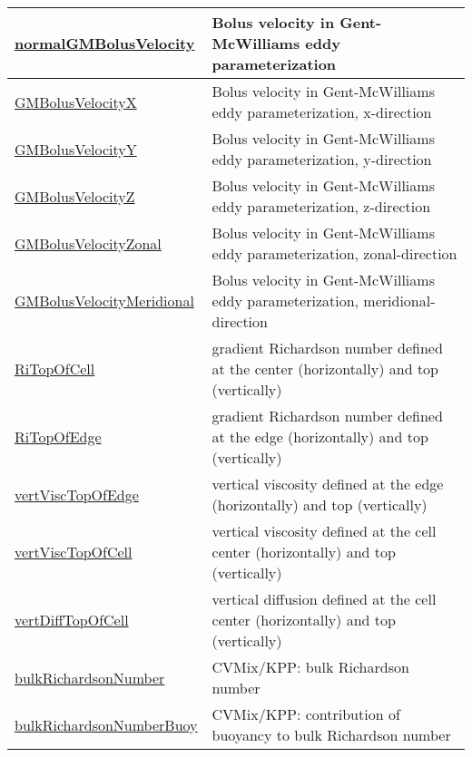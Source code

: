 {\begin{center}
\begin{longtable}{| p{2.0in} | p{4.0in} |}
    \hline
    \hyperref[subsec:var_sec_diagnostics_normalGMBolusVelocity]{normalGMBolusVelocity} & Bolus velocity in Gent-McWilliams eddy parameterization \\
    \hline
    \hyperref[subsec:var_sec_diagnostics_GMBolusVelocityX]{GMBolusVelocityX} & Bolus velocity in Gent-McWilliams eddy parameterization, x-direction \\
    \hline
    \hyperref[subsec:var_sec_diagnostics_GMBolusVelocityY]{GMBolusVelocityY} & Bolus velocity in Gent-McWilliams eddy parameterization, y-direction \\
    \hline
    \hyperref[subsec:var_sec_diagnostics_GMBolusVelocityZ]{GMBolusVelocityZ} & Bolus velocity in Gent-McWilliams eddy parameterization, z-direction \\
    \hline
    \hyperref[subsec:var_sec_diagnostics_GMBolusVelocityZonal]{GMBolusVelocityZonal} & Bolus velocity in Gent-McWilliams eddy parameterization, zonal-direction \\
    \hline
    \hyperref[subsec:var_sec_diagnostics_GMBolusVelocityMeridional]{GMBolusVelocityMeridional} & Bolus velocity in Gent-McWilliams eddy parameterization, meridional-direction \\
    \hline
    \hyperref[subsec:var_sec_diagnostics_RiTopOfCell]{RiTopOfCell} & gradient Richardson number defined at the center (horizontally) and top (vertically) \\
    \hline
    \hyperref[subsec:var_sec_diagnostics_RiTopOfEdge]{RiTopOfEdge} & gradient Richardson number defined at the edge (horizontally) and top (vertically) \\
    \hline
    \hyperref[subsec:var_sec_diagnostics_vertViscTopOfEdge]{vertViscTopOfEdge} & vertical viscosity defined at the edge (horizontally) and top (vertically) \\
    \hline
    \hyperref[subsec:var_sec_diagnostics_vertViscTopOfCell]{vertViscTopOfCell} & vertical viscosity defined at the cell center (horizontally) and top (vertically) \\
    \hline
    \hyperref[subsec:var_sec_diagnostics_vertDiffTopOfCell]{vertDiffTopOfCell} & vertical diffusion defined at the cell center (horizontally) and top (vertically) \\
    \hline
    \hyperref[subsec:var_sec_diagnostics_bulkRichardsonNumber]{bulkRichardsonNumber} & CVMix/KPP: bulk Richardson number \\
    \hline
    \hyperref[subsec:var_sec_diagnostics_bulkRichardsonNumberBuoy]{bulkRichardsonNumberBuoy} & CVMix/KPP: contribution of buoyancy to bulk Richardson number \\

\end{longtable}
\end{center}}

